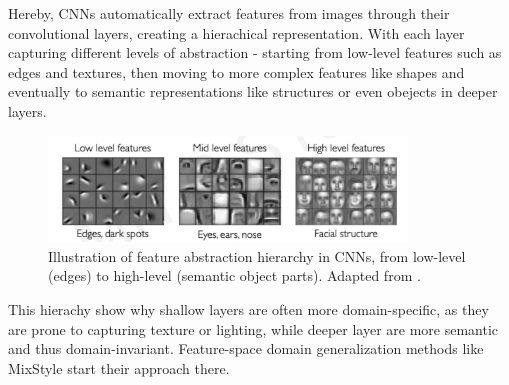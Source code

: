 Hereby, CNNs automatically extract features from images through their convolutional layers, creating a hierachical representation. With each layer capturing different levels of abstraction - starting from low-level features such as edges and textures, then moving to more complex features like shapes and eventually to semantic representations like structures or even obejects in deeper layers. \cite{zeilerVisualizingUnderstandingConvolutional2013,goodfellowDeepLearning2016}

\begin{figure}[ht]
    \centering
    \includegraphics[width=0.85\textwidth]{images/Learning-Feature-Representation.png}
    \caption{Illustration of feature abstraction hierarchy in CNNs, from low-level (edges) to high-level (semantic object parts). Adapted from \cite{alexanderaminiMITIntroductionDeep2025}.}
    \label{fig:Hierachy_of_Features}
\end{figure}

This hierachy show why shallow layers are often more domain-specific, as they are prone to capturing texture or lighting, while deeper layer are more semantic and thus domain-invariant. Feature-space domain generalization methods like MixStyle \cite{zhouMixStyleNeuralNetworks2023} start their approach there.


